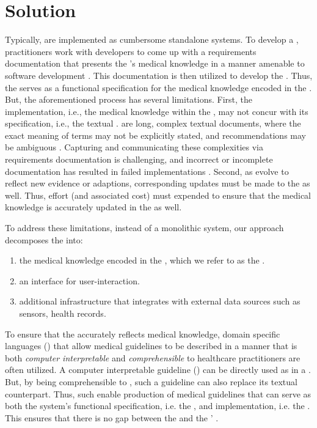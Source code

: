 \section{Solution}

Typically, \CDSS{} are implemented as cumbersome standalone systems.
To develop a \CDSS{}, practitioners work with
developers to come up with a requirements documentation
that presents the \BPGs{}'s medical knowledge in a manner amenable to software development \cite{PelegJBI13}.
This documentation is then utilized to develop the \CDSS{}.
Thus, the \BPG{}
serves as a functional specification for the medical knowledge encoded in the
\CDSS{}.
But, the aforementioned process has several limitations.
First, the implementation, i.e., the medical knowledge within the \CDSS{},
may not concur with its specification, i.e., the textual \BPG{}.
\BPGs{} are long, complex textual documents,
where the exact meaning of terms may not be explicitly stated, and recommendations may be ambiguous \cite{ClerqAIM03}.
Capturing and communicating these complexities via requirements documentation
is challenging, and incorrect or incomplete documentation has resulted in failed
implementations \cite{KubbenBook19}. Second, as \BPGs{} evolve to reflect
new evidence or adaptions, corresponding updates must be made to the
\CDSS{} as well. Thus, effort (and associated cost) must expended to ensure that the medical knowledge
is accurately updated in the \CDSS{} as well.

To address these limitations, instead of a monolithic system, our approach
decomposes the \CDSSs{} into:
\begin{enumerate}[label=(\alph*)]
  \item the medical knowledge encoded in the \CDSS{}, which we refer to as the
    \BPGLogic{}.
  \item an interface for user-interaction.
  \item additional infrastructure that integrates with external data sources
  such as sensors, health records.
\end{enumerate}

To ensure that the \BPGLogic{} accurately reflects medical knowledge,
domain specific languages (\DSL{}) that allow medical guidelines to
be described in a manner that is both \emph{computer interpretable} and
\emph{comprehensible} to healthcare practitioners are often utilized.
A computer interpretable guideline (\CIG{}) can be directly used as
\BPGLogic{} in a \CDSS{}. But, by being comprehensible to \HCPs{},
such a guideline can also replace its textual counterpart.
Thus, such \DSLs{} enable production of medical guidelines that can serve
as both the system's functional specification, i.e. the \BPG{}, and implementation, i.e. the
\BPGLogic{}. This ensures that there is no gap between the \BPG{} and the
\CDSS{}' \BPGLogic{}.

